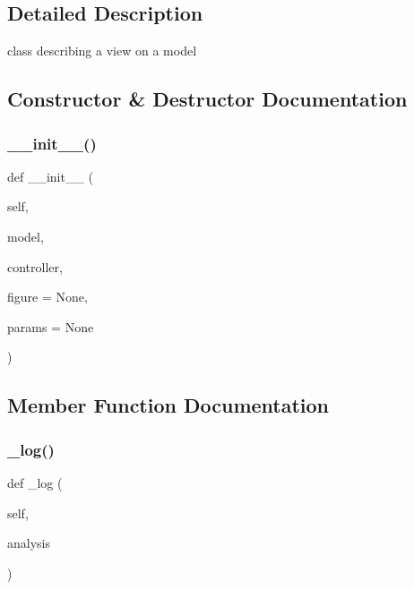 \subsection{Detailed Description}
class describing a view on a model 

\subsection{Constructor \& Destructor Documentation}
\mbox{\label{class_mu_mo_t_1_1_mu_mo_tview_afc93b937eb36816d9e603a372788f55b}} 
\subsubsection{\texorpdfstring{\+\_\+\+\_\+init\+\_\+\+\_\+()}{\_\_init\_\_()}}
{\footnotesize\ttfamily def \+\_\+\+\_\+init\+\_\+\+\_\+ (\begin{DoxyParamCaption}\item[{}]{self,  }\item[{}]{model,  }\item[{}]{controller,  }\item[{}]{figure = {\ttfamily None},  }\item[{}]{params = {\ttfamily None} }\end{DoxyParamCaption})}



\subsection{Member Function Documentation}
\mbox{\label{class_mu_mo_t_1_1_mu_mo_tview_a8b4ffd0e4999bd45c6ca33fe0f40d1e3}} 
\subsubsection{\texorpdfstring{\+\_\+log()}{\_log()}}
{\footnotesize\ttfamily def \+\_\+log (\begin{DoxyParamCaption}\item[{}]{self,  }\item[{}]{analysis }\end{DoxyParamCaption})\hspace{0.3cm}{\ttfamily [private]}}

